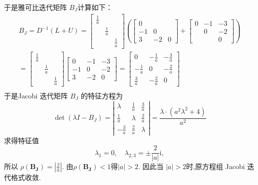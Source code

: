 \begin{tcolorbox}
于是雅可比迭代矩阵 $ B_{J} $计算如下：
$$
\begin{array}{l}
B_{J}=D^{-1}(L+U)=\left[\begin{array}{lll}
\frac{1}{a} & & \\
& \frac{1}{a} & \\
& & \frac{1}{a}
\end{array}\right]\left(\left[\begin{array}{ccc}
0 & & \\
-1 & 0 & \\
3 & -2 & 0
\end{array}\right]+\left[\begin{array}{ccc}
0 & -1 & -3 \\
& 0 & -2 \\
& & 0
\end{array}\right]\right) \\
=\left[\begin{array}{lll}
\frac{1}{a} & & \\
& \frac{1}{a} & \\
& & \frac{1}{a}
\end{array}\right]\left[\begin{array}{ccc}
0 & -1 & -3 \\
-1 & 0 & -2 \\
3 & -2 & 0
\end{array}\right] =\left[\begin{array}{ccc}
0 & -\frac{1}{a} & -\frac{3}{a} \\
-\frac{1}{a} & 0 & -\frac{2}{a} \\
\frac{3}{a} & -\frac{2}{a} & 0
\end{array}\right] \\
\end{array}
$$
 于是Jacobi 迭代矩阵 $ B_J $ 的特征方程为
$$
\operatorname{det}\left(\lambda I-B_{J}\right)=\left|\begin{array}{ccc}
\lambda & \frac{1}{a} & \frac{3}{a} \\
\frac{1}{a} & \lambda & \frac{2}{a} \\
-\frac{3}{a} & \frac{2}{a} & \lambda
\end{array}\right|=\frac{\lambda \cdot\left(a^{2} \lambda^{2}+4\right)}{a^{2}} 
$$
求得特征值
$$
\lambda_{1}=0, \quad \lambda_{2,3}= \pm \frac{2}{|a|} \mathrm{i},
$$
所以 $ \rho(\boldsymbol{B_J})=\left|\frac{2}{a}\right| $. 由$\rho(\boldsymbol{B_J})<1$得$ |a|>2 $. 因此当 $ |a|>2 $时,原方程组 Jacobi 迭代格式收敛.
\end{tcolorbox}


